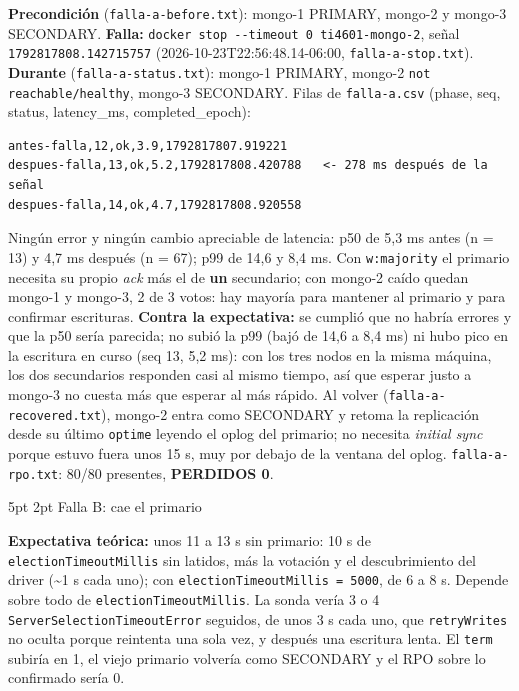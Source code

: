 \documentclass[10pt,letterpaper]{article}
\makeatletter
\renewcommand\subsection{\@startsection{subsection}{2}{\z@}%
  {5pt \@plus 1pt}{2pt}%
  {\normalfont\small\bfseries\color{acc}}}
\makeatother
\begin{document}
\textbf{Precondición} (\texttt{falla-a-before.txt}): mongo-1 PRIMARY, mongo-2 y mongo-3 SECONDARY.
\textbf{Falla:} \texttt{docker stop -{}-timeout 0 ti4601-mongo-2}, señal \texttt{1792817808.142715757}
(2026-10-23T22:56:48.14-06:00, \texttt{falla-a-stop.txt}). \textbf{Durante} (\texttt{falla-a-status.txt}):
mongo-1 PRIMARY, mongo-2 \texttt{not reachable/healthy}, mongo-3 SECONDARY. Filas de \texttt{falla-a.csv}
(phase, seq, status, latency\_ms, completed\_epoch):
\begin{Verbatim}
antes-falla,12,ok,3.9,1792817807.919221
despues-falla,13,ok,5.2,1792817808.420788   <- 278 ms después de la señal
despues-falla,14,ok,4.7,1792817808.920558
\end{Verbatim}
Ningún error y ningún cambio apreciable de latencia: p50 de 5,3 ms antes (n = 13) y 4,7 ms después (n = 67);
p99 de 14,6 y 8,4 ms. Con \texttt{w:majority} el primario necesita su propio \emph{ack} más el de
\textbf{un} secundario; con mongo-2 caído quedan mongo-1 y mongo-3, 2 de 3 votos: hay mayoría para mantener
al primario y para confirmar escrituras. \textbf{Contra la expectativa:} se cumplió que no
habría errores y que la p50 sería parecida; no subió la p99 (bajó de 14,6 a 8,4 ms) ni hubo pico en la
escritura en curso (seq 13, 5,2 ms): con los tres nodos en la misma máquina, los dos secundarios responden casi
al mismo tiempo, así que esperar justo a mongo-3 no cuesta más que esperar al más rápido. Al volver (\texttt{falla-a-recovered.txt}), mongo-2 entra como SECONDARY y retoma
la replicación desde su último \texttt{optime} leyendo el oplog del primario; no necesita \emph{initial
sync} porque estuvo fuera unos 15 s, muy por debajo de la ventana del oplog. \texttt{falla-a-rpo.txt}: 80/80
presentes, \textbf{PERDIDOS 0}.

\subsection{Falla B: cae el primario}

\textbf{Expectativa teórica:} unos 11 a 13 s sin primario: 10 s de \texttt{electionTimeoutMillis} sin latidos, más
la votación y el descubrimiento del driver (\textasciitilde 1 s cada uno); con \texttt{electionTimeoutMillis = 5000}, de
6 a 8 s. Depende sobre todo de \texttt{electionTimeoutMillis}. La sonda vería 3 o 4
\texttt{ServerSelectionTimeoutError} seguidos, de unos 3 s cada uno, que \texttt{retryWrites} no oculta porque
reintenta una sola vez, y después una escritura lenta. El \texttt{term} subiría en 1, el viejo primario
volvería como SECONDARY y el RPO sobre lo confirmado sería 0.
\end{document}
